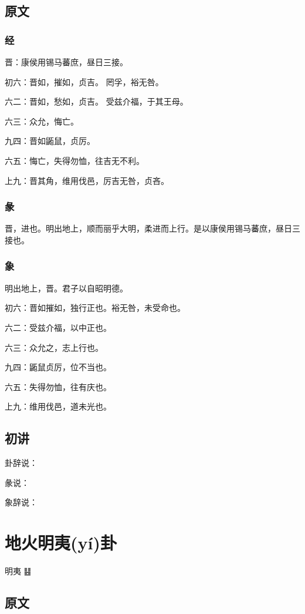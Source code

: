 \documentclass[12pt,oneside]{book}
\begin{document}
\section{原文}

\subsection{经}
晋：康侯用锡马蕃庶，昼日三接。

初六：晋如，摧如，贞吉。 罔孚，裕无咎。

六二：晋如，愁如，贞吉。 受兹介福，于其王母。

六三：众允，悔亡。

九四：晋如鼫鼠，贞厉。

六五：悔亡，失得勿恤，往吉无不利。

上九：晋其角，维用伐邑，厉吉无咎，贞吝。

\subsection{彖}
晋，进也。明出地上，顺而丽乎大明，柔进而上行。是以康侯用锡马蕃庶，昼日三接也。

\subsection{象}
明出地上，晋。君子以自昭明德。

初六：晋如摧如，独行正也。裕无咎，未受命也。

六二：受兹介福，以中正也。

六三：众允之，志上行也。

九四：鼫鼠贞厉，位不当也。

六五：失得勿恤，往有庆也。

上九：维用伐邑，道未光也。

\section{初讲}
卦辞说：

彖说：

象辞说：



\chapter{地火明夷(yí)卦}
明夷 {\Large ䷣}

\section{原文}
\end{document}
